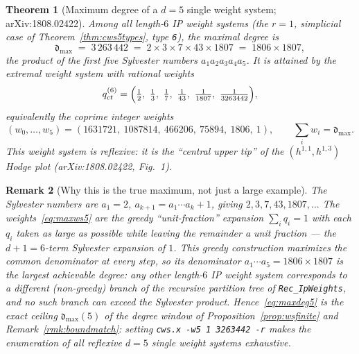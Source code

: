 \documentclass{amsart}
\newtheorem{theorem}{Theorem}[section]
\newtheorem{remark}[theorem]{Remark}
\begin{document}
\begin{theorem}[Maximum degree of a $d=5$ single weight system;
arXiv:1808.02422]\label{thm:maxdeg5}
Among all length-$6$ IP weight systems (the $r=1$, simplicial case of
Theorem~\ref{thm:cws5types}, type \texttt{6}), the maximal degree is
\begin{equation}\label{eq:maxdeg5}
  \mathfrak{d}_{\max}
  \;=\; 3\,263\,442
  \;=\; 2 \times 3 \times 7 \times 43 \times 1807
  \;=\; 1806 \times 1807 ,
\end{equation}
the product of the first five Sylvester numbers $a_1 a_2 a_3 a_4 a_5$. It is
attained by the extremal weight system with rational weights
\begin{equation}\label{eq:maxws5}
  q^{(6)}_{ct}
  = \Bigl(\tfrac12,\ \tfrac13,\ \tfrac17,\ \tfrac1{43},\
          \tfrac1{1807},\ \tfrac1{3263442}\Bigr),
\end{equation}
equivalently the coprime integer weights
\begin{equation}\label{eq:maxws5int}
  (w_0,\dots,w_5)
  = (1631721,\ 1087814,\ 466206,\ 75894,\ 1806,\ 1),
  \qquad \sum_i w_i = \mathfrak{d}_{\max}.
\end{equation}
This weight system is reflexive: it is the ``central upper tip'' of the
$(h^{1,1},h^{1,3})$ Hodge plot (arXiv:1808.02422, Fig.~1).
\end{theorem}

\begin{remark}[Why this is the true maximum, not just a large example]
\label{rmk:maxdeg5}
The Sylvester numbers are $a_1=2$, $a_{k+1}=a_1\cdots a_k+1$, giving
$2,3,7,43,1807,\dots$ The weights~\eqref{eq:maxws5} are the greedy
``unit-fraction'' expansion $\sum_i q_i = 1$ with each $q_i$ taken as large as
possible while leaving the remainder a unit fraction --- the
$d{+}1=6$-term Sylvester expansion of $1$. This greedy construction maximizes
the common denominator at every step, so its denominator
$a_1\cdots a_5 = 1806\times 1807$ is the largest achievable degree: any other
length-$6$ IP weight system corresponds to a different (non-greedy) branch of
the recursive partition tree of \texttt{Rec\_IpWeights}, and no such branch can
exceed the Sylvester product. Hence~\eqref{eq:maxdeg5} is the exact ceiling
$\mathfrak{d}_{\max}(5)$ of the degree window of
Proposition~\ref{prop:wsfinite} and Remark~\ref{rmk:boundmatch}: setting
\texttt{cws.x -w5 1 3263442 -r} makes the enumeration of all reflexive $d=5$
single weight systems \emph{exhaustive}.
\end{remark}
\end{document}

